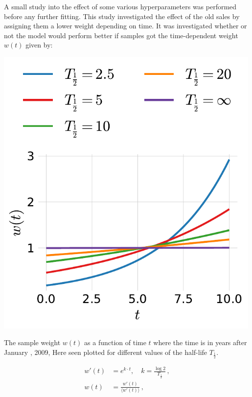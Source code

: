 A small study into the effect of some various hyperparameters was performed before any further fitting. This study investigated the effect of the old sales by assigning them a lower weight depending on time. It was investigated whether or not the model would perform better if samples got the time-dependent weight $w(t)$ given by:

\begin{marginfigure}[-0.5cm]
  \includegraphics[width=0.99\textwidth]{figures/housing/Villa_v18_cut_all_Ncols_all_half_life_weights.pdf}
  \caption[Sample Weight as a Function of Time for Different Half-Lives.]
    {The sample weight $w(t)$ as a function of time $t$ where the time is in years after January , 2009, Here seen plotted for different values of the half-life $T_{\frac{1}{2}}$.}
  \label{fig:h:half-life}
\end{marginfigure}

\begin{equation}
  \begin{split}
    w'(t) &= e^{ k \cdot t}, \quad k = \frac{\log 2}{T_{\frac{1}{2}}} \, ,\\
    w(t) &= \frac{w'(t)}{\langle w'(t) \rangle} \, ,
  \end{split}
  \label{eg:h:sample_weight}
\end{equation}


